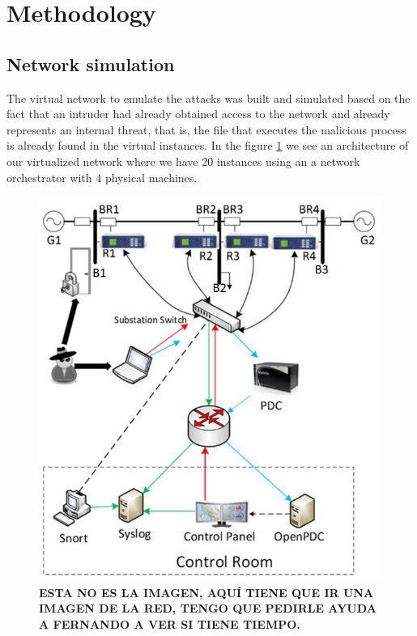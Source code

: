 \documentclass{iosart2c}
\begin{document}
\section{Methodology}

\subsection{Network simulation}

The virtual network to emulate the attacks was built and simulated based on the fact that an intruder had already obtained access to the network and already represents an internal threat, that is, the file that executes the malicious process is already found in the virtual instances. In the figure \ref{fig:virtual_network} we see an architecture of our virtualized network where we have 20 instances using an a network orchestrator with 4 physical machines.\\


\begin{figure}[h!]
\centering
\includegraphics[scale=0.56]{figs/network/diagrama_ejemplo.jpg}
\caption{\textbf{ESTA NO ES LA IMAGEN, AQUÍ TIENE QUE IR UNA IMAGEN DE LA RED, TENGO QUE PEDIRLE AYUDA A FERNANDO A VER SI TIENE TIEMPO.}}
\label{fig:virtual_network}
\end{figure}
\end{document}
